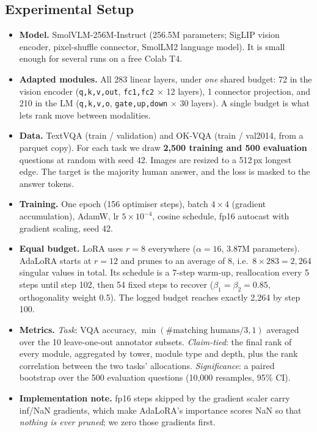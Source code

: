 \documentclass[12pt,a4paper]{article}
\begin{document}
\subsection{Experimental Setup}
\begin{itemize}
    \item \textbf{Model.} SmolVLM-256M-Instruct (256.5M parameters; SigLIP vision encoder, pixel-shuffle
    connector, SmolLM2 language model). It is small enough for several runs on a free Colab T4.
    \item \textbf{Adapted modules.} All 283 linear layers, under \emph{one} shared budget: 72 in the vision encoder
    (\texttt{q,k,v,out}, \texttt{fc1,fc2} $\times$ 12 layers), 1 connector projection, and 210 in the LM
    (\texttt{q,k,v,o}, \texttt{gate,up,down} $\times$ 30 layers). A single budget is what lets rank move between modalities.
    \item \textbf{Data.} TextVQA (train / validation) and OK-VQA (train / val2014, from a
    parquet copy). For each task we draw \textbf{2{,}500 training and 500 evaluation} questions at random with
    seed 42. Images are resized to a 512\,px longest edge. The target is the majority human answer, and the loss is
    masked to the answer tokens.
    \item \textbf{Training.} One epoch (156 optimiser steps), batch $4\times4$ (gradient accumulation), AdamW,
    lr $5\times10^{-4}$, cosine schedule, fp16 autocast with gradient scaling, seed 42.
    \item \textbf{Equal budget.} LoRA uses $r{=}8$ everywhere ($\alpha{=}16$, 3.87M parameters). AdaLoRA starts at
    $r{=}12$ and prunes to an average of 8, i.e.\ $8\times283=2{,}264$ singular values in total. Its schedule is a
    7-step warm-up, reallocation every 5 steps until step 102, then 54 fixed steps to recover
    ($\beta_1{=}\beta_2{=}0.85$, orthogonality weight 0.5). The logged budget reaches exactly 2{,}264 by step 100.
    \item \textbf{Metrics.} \emph{Task}: VQA accuracy, $\min(\#\text{matching humans}/3,1)$ averaged over the 10
    leave-one-out annotator subsets. \emph{Claim-tied}: the final rank of every module, aggregated by tower, module
    type and depth, plus the rank correlation between the two tasks' allocations. \emph{Significance}: a paired
    bootstrap over the 500 evaluation questions (10{,}000 resamples, 95\% CI).
    \item \textbf{Implementation note.} fp16 steps skipped by the gradient scaler carry inf/NaN gradients, which make
    AdaLoRA's importance scores NaN so that \emph{nothing is ever pruned}; we zero those gradients first.
\end{itemize}
\end{document}

